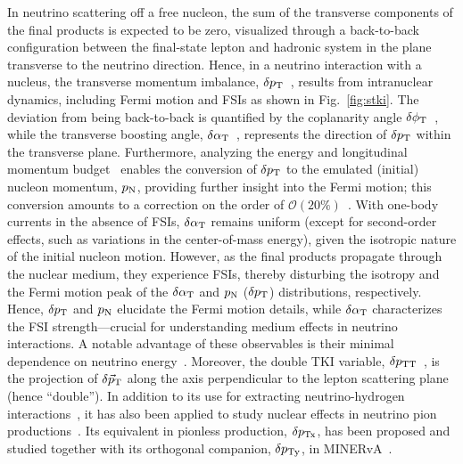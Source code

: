 In neutrino scattering off a free nucleon, the sum of the transverse components of the final products is expected to be zero, visualized through a back-to-back configuration between the final-state lepton and hadronic system in the  plane transverse to the neutrino direction. Hence, in a neutrino interaction with a nucleus, the transverse momentum imbalance, $\delta p_\textrm{T}$~\cite{Lu:2015tcr}, results from intranuclear dynamics, including Fermi motion and FSIs  as shown in Fig.~\ref{fig:stki}. The deviation from being back-to-back is quantified by the  coplanarity angle $\delta\phi_\textrm{T}$~\cite{Lu:2015tcr}, while the transverse boosting angle, $\delta\alpha_\textrm{T}$~\cite{Lu:2015tcr}, represents the direction of $\delta p_\textrm{T}$ within the transverse plane. Furthermore, analyzing the energy and longitudinal momentum budget~\cite{Furmanski:2016wqo, Lu:2019nmf} enables the conversion of $\delta p_\textrm{T}$ to the emulated (initial) nucleon momentum, $p_\textrm{N}$,  providing further insight into the Fermi motion; this conversion amounts to a correction on the order of $\mathcal{O}(20\%)$~\cite{Yang:2023dxk}. 
With one-body currents in the absence of FSIs, $\delta\alpha_\textrm{T}$ remains uniform (except for second-order effects, such as variations in the center-of-mass energy), given the isotropic nature of the initial nucleon motion. However, as the final products propagate through the nuclear medium, they experience FSIs, thereby disturbing the isotropy and the Fermi motion peak of the $\delta\alpha_\textrm{T}$ and $p_\textrm{N}$ ($\delta p_\textrm{T}$) distributions, respectively. Hence, $\delta p_\textrm{T}$ and $p_\textrm{N}$ elucidate the Fermi motion details, while $\delta\alpha_\textrm{T}$  characterizes the FSI strength---crucial for understanding medium effects in neutrino interactions. A notable advantage of these observables is their minimal dependence on neutrino energy~\cite{Lu:2015tcr}. Moreover, the double TKI variable, $\delta p_\textrm{TT}$~\cite{Lu:2015hea}, is the projection of $\delta \vec{p}_\textrm{T}$ along the axis perpendicular to the lepton scattering plane (hence ``double''). In addition to its use for extracting neutrino-hydrogen interactions~\cite{Lu:2015hea, Hamacher-Baumann:2020ogq}, it has also been applied to study nuclear effects in neutrino pion productions~\cite{MINERvA:2020anu, T2K:2021naz}. Its equivalent in pionless production, $\delta p_\textrm{Tx}$, has been proposed and studied together with its orthogonal companion, $\delta p_\textrm{Ty}$, in MINERvA~\cite{MINERvA:2019ope}. 
